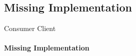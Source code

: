 \subsection{Missing Implementation}

\begin{frame}{Consumer Client}
    \framesubtitle{Missing Implementation}
\end{frame}
